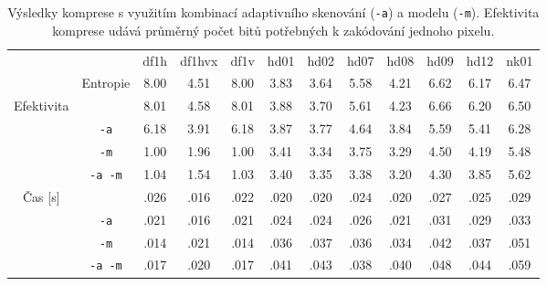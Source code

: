 \documentclass[a4paper, 11pt, fleqn]{scrartcl}
\begin{document}
      \begin{table}[!h]
        \centering
        \captionsetup{justification=justified}
        \begin{tabular}{|c|c||c|c|c|c|c|c|c|c|c|c|}
          \cline{3-12}
          \multicolumn{2}{c||}{}                                 & df1h & df1hvx & df1v & hd01 & hd02 & hd07 & hd08 & hd09 & hd12 & nk01\\[0.5ex]
          \cline{2-12}\morecmidrules\cmidrule{2-12}
          \multicolumn{1}{c|}{}       & Entropie                & 8.00 &  4.51  & 8.00 & 3.83 & 3.64 & 5.58 & 4.21 & 6.62 & 6.17 & 6.47\\[0.5ex]
          \hline
          \multirow{4}{*}{Efektivita} &                & 8.01 &  4.58  & 8.01 & 3.88 & 3.70 & 5.61 & 4.23 & 6.66 & 6.20 & 6.50\\[0.5ex]
                                      & \texttt{-a}    & 6.18 &  3.91  & 6.18 & 3.87 & 3.77 & 4.64 & 3.84 & 5.59 & 5.41 & 6.28\\[0.5ex]
                                      & \texttt{-m}    & 1.00 &  1.96  & 1.00 & 3.41 & 3.34 & 3.75 & 3.29 & 4.50 & 4.19 & 5.48\\[0.5ex]
                                      & \texttt{-a -m} & 1.04 &  1.54  & 1.03 & 3.40 & 3.35 & 3.38 & 3.20 & 4.30 & 3.85 & 5.62\\[0.5ex]
          \hline
          \multirow{4}{*}{Čas [s]}    &                & .026 &  .016  & .022 & .020 & .020 & .024 & .020 & .027 & .025 & .029\\[0.5ex]
                                      & \texttt{-a}    & .021 &  .016  & .021 & .024 & .024 & .026 & .021 & .031 & .029 & .033\\[0.5ex]
                                      & \texttt{-m}    & .014 &  .021  & .014 & .036 & .037 & .036 & .034 & .042 & .037 & .051\\[0.5ex]
                                      & \texttt{-a -m} & .017 &  .020  & .017 & .041 & .043 & .038 & .040 & .048 & .044 & .059\\[0.5ex]
          \hline

        \end{tabular}
        \caption{Výsledky komprese s využitím kombinací adaptivního skenování (\texttt{-a}) a modelu (\texttt{-m}). Efektivita komprese udává průměrný počet bitů potřebných k zakódování jednoho pixelu.}
      \end{table}
\end{document}
